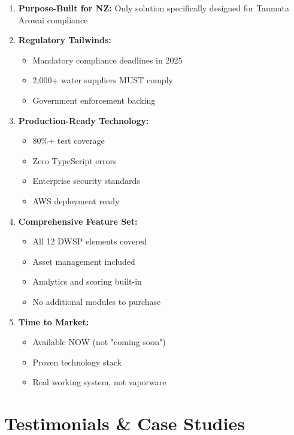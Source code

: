 \documentclass[11pt,a4paper]{article}
\begin{document}
\begin{enumerate}[leftmargin=*, itemsep=0.5em]
    \item \textbf{Purpose-Built for NZ:} Only solution specifically designed for Taumata Arowai compliance

    \item \textbf{Regulatory Tailwinds:}
    \begin{itemize}
        \item Mandatory compliance deadlines in 2025
        \item 2,000+ water suppliers MUST comply
        \item Government enforcement backing
    \end{itemize}

    \item \textbf{Production-Ready Technology:}
    \begin{itemize}
        \item 80\%+ test coverage
        \item Zero TypeScript errors
        \item Enterprise security standards
        \item AWS deployment ready
    \end{itemize}

    \item \textbf{Comprehensive Feature Set:}
    \begin{itemize}
        \item All 12 DWSP elements covered
        \item Asset management included
        \item Analytics and scoring built-in
        \item No additional modules to purchase
    \end{itemize}

    \item \textbf{Time to Market:}
    \begin{itemize}
        \item Available NOW (not "coming soon")
        \item Proven technology stack
        \item Real working system, not vaporware
    \end{itemize}
\end{enumerate}

\newpage

\section{Testimonials \& Case Studies}
\end{document}
